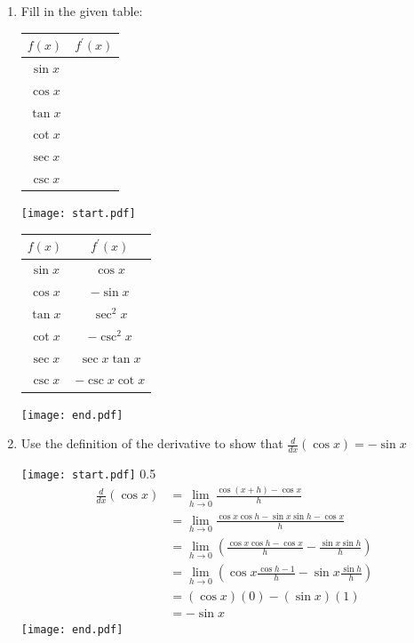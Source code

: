 \documentclass[12pt]{article}
\begin{document}
\begin{enumerate}

\item Fill in the given table:

\begin{center}
\begin{tabular}{c|c}
$f(x)$ & $f^{\prime}(x)$\\
\hline
$\sin{x}$ &  \\
\hline
$\cos{x}$ & \\
\hline
$\tan{x}$ & \\
\hline
$\cot{x}$ & \\
\hline
$\sec{x}$ & \\
\hline
$\csc{x}$ & 
\end{tabular}
\end{center}

\texttt{[image: start.pdf]}
{{
\begin{tabular}{c|c}
$f(x)$ & $f^{\prime}(x)$\\
\hline
$\sin{x}$ & $\cos{x}$  \\
\hline
$\cos{x}$ & $-\sin{x}$ \\
\hline
$\tan{x}$ & $\sec^2{x}$\\
\hline
$\cot{x}$ & $-\csc^2{x}$\\
\hline
$\sec{x}$ & $\sec{x}\tan{x}$\\
\hline
$\csc{x}$ & $-\csc{x}\cot{x}$ 
\end{tabular}
}}
\texttt{[image: end.pdf]}


\newpage

\item Use the definition of the derivative to show that $\frac{d}{dx}(\cos{x})=-\sin{x}$

\texttt{[image: start.pdf]}
{{{0.5\linewidth}{
\begin{align*}
\frac{d}{dx}(\cos{x})&=\lim_{h \rightarrow 0}{\frac{\cos{(x+h)}-\cos{x}}{h}}\\
&=\lim_{h \rightarrow 0}{\frac{\cos{x}\cos{h}-\sin{x}\sin{h}-\cos{x}}{h}}\\
&=\lim_{h \rightarrow 0}{\left(\frac{\cos{x}\cos{h}-\cos{x}}{h}-\frac{\sin{x}\sin{h}}{h}\right)}\\
&=\lim_{h \rightarrow 0}{\left(\cos{x}\frac{\cos{h}-1}{h}-\sin{x}\frac{\sin{h}}{h}\right)}\\
&=(\cos{x})(0)-(\sin{x})(1)\\
&=-\sin{x}
\end{align*}
}}}
\texttt{[image: end.pdf]}


\end{enumerate}
\end{document}

